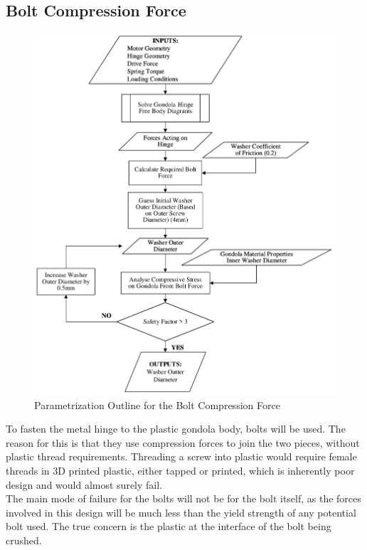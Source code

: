 \documentclass[../main.tex]{subfiles}
\begin{document}
\subsection{Bolt Compression Force} \label{compressive}

\begin{figure}[H]
	\centering
	\includegraphics[width=.9\linewidth]{img/paramaterization/compressionBolt.pdf}
	\caption{Parametrization Outline for the Bolt Compression Force}
	\label{fig:boltCompressionParametrization}
\end{figure}

To fasten the metal hinge to the plastic gondola body, bolts will be used. The reason for this is that they use compression forces to join the two pieces, without plastic thread requirements. Threading a screw into plastic would require female threads in 3D printed plastic, either tapped or printed, which is inherently poor design and would almost surely fail. \\

The main mode of failure for the bolts will not be for the bolt itself, as the forces involved in this design will be much less than the yield strength of any potential bolt used. The true concern is the plastic at the interface of the bolt being crushed. \\
\end{document}
